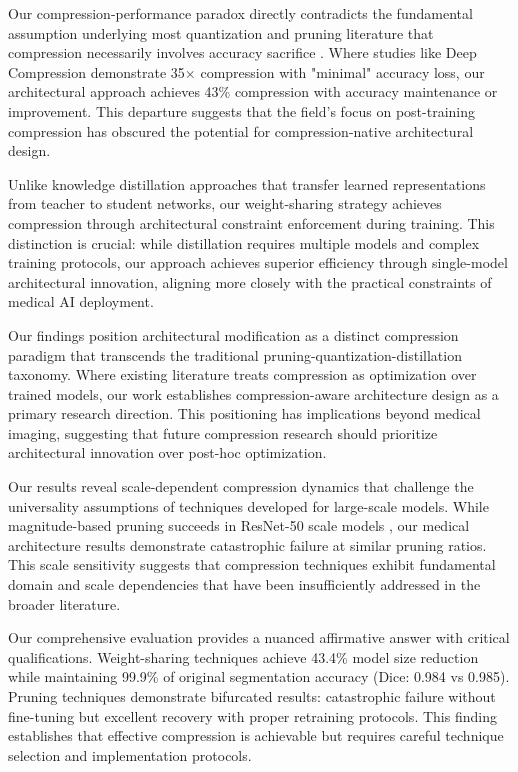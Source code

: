 \documentclass[12pt,a4paper]{article}
\begin{document}
\begin{enumerate}
Our compression-performance paradox directly contradicts the fundamental assumption underlying most quantization and pruning literature that compression necessarily involves accuracy sacrifice \cite{Han2015deep, Gale2020Sparse}. Where studies like Deep Compression \cite{Han2015deep} demonstrate 35× compression with "minimal" accuracy loss, our architectural approach achieves 43\% compression with accuracy maintenance or improvement. This departure suggests that the field's focus on post-training compression has obscured the potential for compression-native architectural design.

Unlike knowledge distillation approaches that transfer learned representations from teacher to student networks, our weight-sharing strategy achieves compression through architectural constraint enforcement during training. This distinction is crucial: while distillation requires multiple models and complex training protocols, our approach achieves superior efficiency through single-model architectural innovation, aligning more closely with the practical constraints of medical AI deployment.

Our findings position architectural modification as a distinct compression paradigm that transcends the traditional pruning-quantization-distillation taxonomy. Where existing literature treats compression as optimization over trained models, our work establishes compression-aware architecture design as a primary research direction. This positioning has implications beyond medical imaging, suggesting that future compression research should prioritize architectural innovation over post-hoc optimization.

Our results reveal scale-dependent compression dynamics that challenge the universality assumptions of techniques developed for large-scale models. While magnitude-based pruning succeeds in ResNet-50 scale models \cite{Liu2023Survey}, our medical architecture results demonstrate catastrophic failure at similar pruning ratios. This scale sensitivity suggests that compression techniques exhibit fundamental domain and scale dependencies that have been insufficiently addressed in the broader literature.

Our comprehensive evaluation provides a nuanced affirmative answer with critical qualifications. Weight-sharing techniques achieve 43.4\% model size reduction while maintaining 99.9\% of original segmentation accuracy (Dice: 0.984 vs 0.985). Pruning techniques demonstrate bifurcated results: catastrophic failure without fine-tuning but excellent recovery with proper retraining protocols. This finding establishes that effective compression is achievable but requires careful technique selection and implementation protocols.


\end{enumerate}
\end{document}
